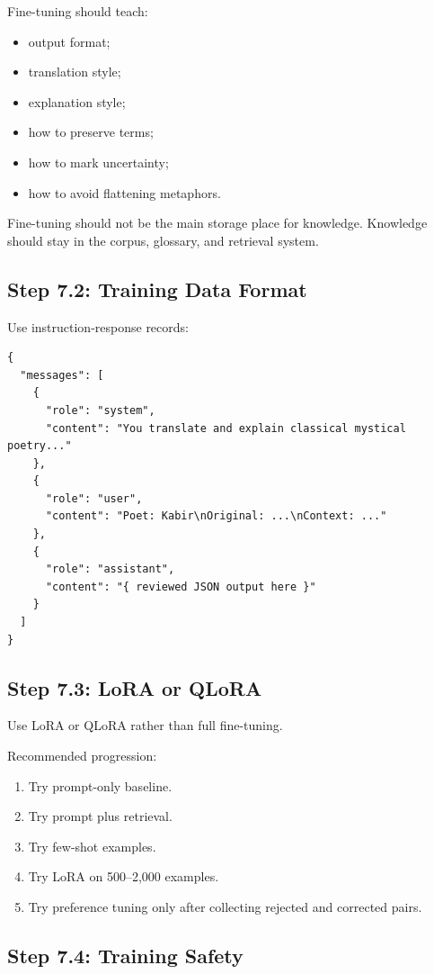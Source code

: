 \documentclass[11pt]{article}
\begin{document}
Fine-tuning should teach:

\begin{itemize}
  \item output format;
  \item translation style;
  \item explanation style;
  \item how to preserve terms;
  \item how to mark uncertainty;
  \item how to avoid flattening metaphors.
\end{itemize}

Fine-tuning should not be the main storage place for knowledge. Knowledge should
stay in the corpus, glossary, and retrieval system.

\subsection{Step 7.2: Training Data Format}

Use instruction-response records:

\begin{verbatim}
{
  "messages": [
    {
      "role": "system",
      "content": "You translate and explain classical mystical poetry..."
    },
    {
      "role": "user",
      "content": "Poet: Kabir\nOriginal: ...\nContext: ..."
    },
    {
      "role": "assistant",
      "content": "{ reviewed JSON output here }"
    }
  ]
}
\end{verbatim}

\subsection{Step 7.3: LoRA or QLoRA}

Use LoRA or QLoRA rather than full fine-tuning.

Recommended progression:

\begin{enumerate}
  \item Try prompt-only baseline.
  \item Try prompt plus retrieval.
  \item Try few-shot examples.
  \item Try LoRA on 500--2,000 examples.
  \item Try preference tuning only after collecting rejected and corrected pairs.
\end{enumerate}

\subsection{Step 7.4: Training Safety}
\end{document}
